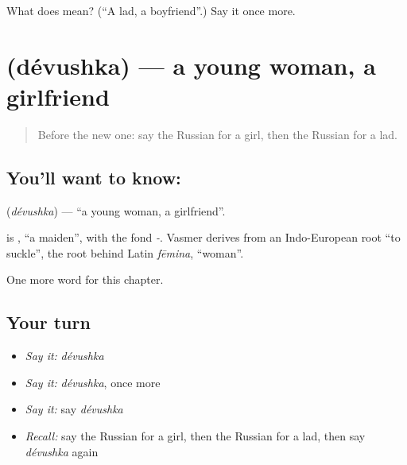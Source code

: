 \begin{tcolorbox}[breakable,colback=teal!4,colframe=teal!35!black,title={Before you move on}]
What does  mean? (\textquotedblleft{}A lad, a boyfriend\textquotedblright{}.) Say it once more.
\end{tcolorbox}
\section[\texorpdfstring{\ru{девушка} (dévushka)}{девушка (dévushka)}]{ (dévushka) — a young woman, a girlfriend}

\label{lesson:RU-C254-devushka}



\begin{quote}
Before the new one: say the Russian for a girl, then the Russian for a lad.
\end{quote}

\subsection*{You'll want to know: }
\textbf{} (\emph{dévushka}) — \textquotedblleft{}a young woman, a girlfriend\textquotedblright{}.

\begin{cousinweb}
\textbf{} is \emph{}, \textquotedblleft{}a maiden\textquotedblright{}, with the fond \emph{-}. Vasmer derives \emph{} from an Indo-European root \textquotedblleft{}to suckle\textquotedblright{}, the root behind Latin \emph{fēmina}, \textquotedblleft{}woman\textquotedblright{}.
\end{cousinweb}

\begin{grammarlens}[title={What you've built}]
One more word for this chapter.
\end{grammarlens}

\subsection*{Your turn}
\begin{itemize}
\raggedright
  \item \emph{Say it:} \emph{dévushka}
  \item \emph{Say it:} \emph{dévushka}, once more
  \item \emph{Say it:} say \emph{dévushka}
  \item \emph{Recall:} say the Russian for a girl, then the Russian for a lad, then say \emph{dévushka} again
\end{itemize}


